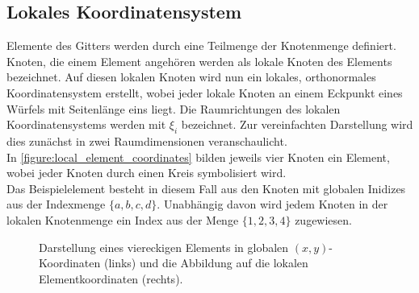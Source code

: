 \documentclass[
	a4paper,			%
	11pt,				%
	headsepline,		%
	bibtotoc,			%
	BCOR18mm,      		%
	DIV14,				%
	headings=normal,
	numbers=noenddot,
]{scrbook}
\theoremstyle{mythmstyle}
\theoremstyle{other}
\begin{document}
	\subsection{Lokales Koordinatensystem}
		Elemente des Gitters werden durch eine Teilmenge der Knotenmenge definiert.
		Knoten, die einem Element angehören werden als lokale Knoten des Elements
		bezeichnet. Auf diesen lokalen Knoten wird nun ein lokales, orthonormales 
		Koordinatensystem erstellt, wobei jeder lokale Knoten an einem Eckpunkt
		eines Würfels mit Seitenlänge eins liegt.
		Die Raumrichtungen des lokalen Koordinatensystems werden mit $\xi_i$
		bezeichnet.
		Zur vereinfachten Darstellung wird dies zunächst in zwei 
		Raumdimensionen veranschaulicht.\\
		In \autoref{figure:local_element_coordinates} bilden jeweils vier Knoten
		ein Element, wobei jeder Knoten durch einen Kreis symbolisiert wird.\\
		Das Beispielelement besteht in diesem Fall aus den Knoten mit globalen
		 Inidizes aus der Indexmenge $\{a,b,c,d\}$. Unabhängig davon wird jedem
		 Knoten in der lokalen Knotenmenge ein Index aus der Menge $\{1,2,3,4\}$
		 zugewiesen.\\
		\begin{figure}[h]
		\caption{Darstellung eines viereckigen Elements in globalen
		 $(x,y)$-Koordinaten (links) und die Abbildung auf die lokalen 
		 Elementkoordinaten (rechts).}
		 \label{figure:local_element_coordinates}
		\end{figure}\\		 
\end{document}
